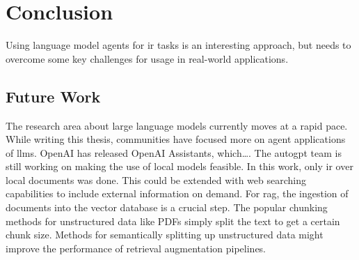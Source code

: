\documentclass[../main.tex]{subfiles}
\begin{document}
\chapter{Conclusion}
\label{ch:conclusion}

Using language model agents for \gls{ir} tasks is an interesting approach,
but needs to overcome some key challenges for usage in real-world applications.

\section{Future Work}

The research area about large language models currently moves at a rapid pace.
While writing this thesis, communities have focused more on agent applications of \glspl{llm}.
OpenAI has released OpenAI Assistants, which\dots.
The \gls{autogpt} team is still working on making the use of local models feasible.
In this work, only \gls{ir} over local documents was done.
This could be extended with web searching capabilities to include external information on demand.
For \gls{rag}, the ingestion of documents into the vector database is a crucial step.
The popular chunking methods for unstructured data like PDFs simply split the text to get a certain chunk size.
Methods for semantically splitting up unstructured data might improve the performance of retrieval augmentation pipelines.
\end{document}
